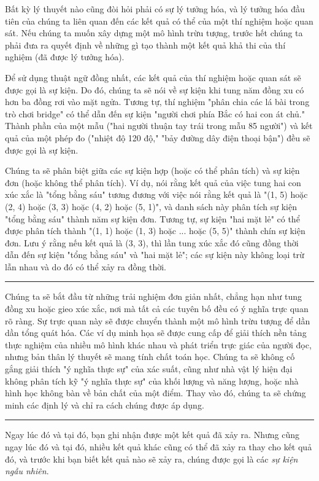 \documentclass[12pt]{article} %
\begin{document}
Bất kỳ lý thuyết nào cũng đòi hỏi phải có sự lý tưởng hóa, và lý tưởng hóa đầu tiên của chúng ta liên quan đến các kết quả có thể của một thí nghiệm hoặc quan sát. Nếu chúng ta muốn xây dựng một mô hình trừu tượng, trước hết chúng ta phải đưa ra quyết định về những gì tạo thành một kết quả khả thi của thí nghiệm (đã được lý tưởng hóa).

Để sử dụng thuật ngữ đồng nhất, các kết quả của thí nghiệm hoặc quan sát sẽ được gọi là sự kiện. Do đó, chúng ta sẽ nói về sự kiện khi tung năm đồng xu có hơn ba đồng rơi vào mặt ngửa. Tương tự, thí nghiệm "phân chia các lá bài trong trò chơi bridge" có thể dẫn đến sự kiện "người chơi phía Bắc có hai con át chủ." Thành phần của một mẫu ("hai người thuận tay trái trong mẫu 85 người") và kết quả của một phép đo ("nhiệt độ 120 độ," "bảy đường dây điện thoại bận") đều sẽ được gọi là sự kiện.

Chúng ta sẽ phân biệt giữa các sự kiện hợp (hoặc có thể phân tích) và sự kiện đơn (hoặc không thể phân tích). Ví dụ, nói rằng kết quả của việc tung hai con xúc xắc là "tổng bằng sáu" tương đương với việc nói rằng kết quả là "(1, 5) hoặc (2, 4) hoặc (3, 3) hoặc (4, 2) hoặc (5, 1)", và danh sách này phân tích sự kiện "tổng bằng sáu" thành năm sự kiện đơn. Tương tự, sự kiện "hai mặt lẻ" có thể được phân tích thành "(1, 1) hoặc (1, 3) hoặc ... hoặc (5, 5)" thành chín sự kiện đơn. Lưu ý rằng nếu kết quả là (3, 3), thì lần tung xúc xắc đó cũng đồng thời dẫn đến sự kiện "tổng bằng sáu" và "hai mặt lẻ"; các sự kiện này không loại trừ lẫn nhau và do đó có thể xảy ra đồng thời.

\noindent\rule{\textwidth}{.4pt}

Chúng ta sẽ bắt đầu từ những trải nghiệm đơn giản nhất, chẳng hạn như tung đồng xu hoặc gieo xúc xắc, nơi mà tất cả các tuyên bố đều có ý nghĩa trực quan rõ ràng. Sự trực quan này sẽ được chuyển thành một mô hình trừu tượng để dần dần tổng quát hóa. Các ví dụ minh họa sẽ được cung cấp để giải thích nền tảng thực nghiệm của nhiều mô hình khác nhau và phát triển trực giác của người đọc, nhưng bản thân lý thuyết sẽ mang tính chất toán học. Chúng ta sẽ không cố gắng giải thích "ý nghĩa thực sự" của xác suất, cũng như nhà vật lý hiện đại không phân tích kỹ "ý nghĩa thực sự" của khối lượng và năng lượng, hoặc nhà hình học không bàn về bản chất của một điểm. Thay vào đó, chúng ta sẽ chứng minh các định lý và chỉ ra cách chúng được áp dụng.

\noindent\rule{\textwidth}{.4pt}

Ngay lúc đó và tại đó, bạn ghi nhận được một kết quả đã xảy ra. Nhưng cũng ngay lúc đó và tại đó, nhiều kết quả khác cũng có thể đã xảy ra thay cho kết quả đó, và trước khi bạn biết kết quả nào sẽ xảy ra, chúng được gọi là các \emph{sự kiện ngẫu nhiên}.
\end{document}
